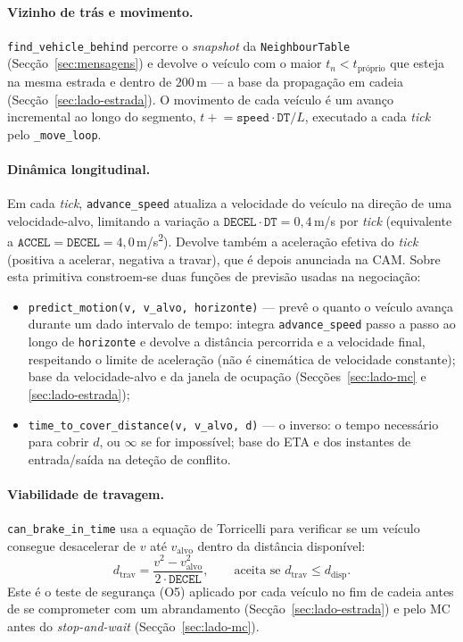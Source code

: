 \documentclass[11pt,a4paper]{article}
\begin{document}
\paragraph{Vizinho de trás e movimento.} \texttt{find\_vehicle\_behind} percorre o
\emph{snapshot} da \texttt{NeighbourTable} (Secção~\ref{sec:mensagens}) e devolve o veículo
com o maior $t_n < t_{\text{próprio}}$ que esteja na mesma estrada e dentro de $200$\,m ---
a base da propagação em cadeia (Secção~\ref{sec:lado-estrada}). O movimento de cada veículo
é um avanço incremental ao longo do segmento, $t \mathrel{+}= \texttt{speed}\cdot\texttt{DT}/L$,
executado a cada \emph{tick} pelo \texttt{\_move\_loop}.

\paragraph{Dinâmica longitudinal.} Em cada \emph{tick}, \texttt{advance\_speed} atualiza a
velocidade do veículo na direção de uma velocidade-alvo, limitando a variação a
$\texttt{DECEL}\cdot\texttt{DT}=0{,}4$\,m/s por \emph{tick} (equivalente a
$\texttt{ACCEL}=\texttt{DECEL}=4{,}0$\,m/s\textsuperscript{2}). Devolve também a aceleração
efetiva do \emph{tick} (positiva a acelerar, negativa a travar), que é depois anunciada na
CAM. Sobre esta primitiva constroem-se duas funções de previsão usadas na negociação:
\begin{itemize}[noitemsep,topsep=2pt]
  \item \texttt{predict\_motion(v, v\_alvo, horizonte)} --- prevê o quanto o veículo avança
        durante um dado intervalo de tempo: integra \texttt{advance\_speed} passo a passo ao
        longo de \texttt{horizonte} e devolve a distância percorrida e a velocidade final,
        respeitando o limite de aceleração (não é cinemática de velocidade constante); base da
        velocidade-alvo e da janela de ocupação (Secções~\ref{sec:lado-mc} e
        \ref{sec:lado-estrada});
  \item \texttt{time\_to\_cover\_distance(v, v\_alvo, d)} --- o inverso: o tempo necessário
        para cobrir $d$, ou $\infty$ se for impossível; base do
        ETA e dos instantes de entrada/saída na deteção de conflito.
\end{itemize}

\paragraph{Viabilidade de travagem.} \texttt{can\_brake\_in\_time} usa a equação de
Torricelli para verificar se um veículo consegue desacelerar de $v$ até $v_{\text{alvo}}$
dentro da distância disponível:
\[
  d_{\text{trav}} = \frac{v^{2} - v_{\text{alvo}}^{2}}{2\cdot\texttt{DECEL}},
  \qquad \text{aceita se } d_{\text{trav}} \le d_{\text{disp}} .
\]
Este é o teste de segurança (O5) aplicado por cada veículo no fim de cadeia antes de se
comprometer com um abrandamento (Secção~\ref{sec:lado-estrada}) e pelo MC antes do
\emph{stop-and-wait} (Secção~\ref{sec:lado-mc}).
\end{document}
